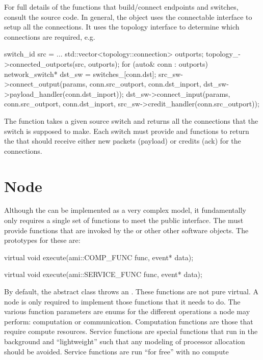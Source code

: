 For full details of the functions that build/connect endpoints and switches, consult the source code.
In general, the  object uses the connectable interface to setup all the connections.
It uses the topology interface to determine which connections are required, e.g.

\begin{CppCode}
switch_id src = ...
std::vector<topology::connection> outports;
topology_->connected_outports(src, outports);
for (auto& conn : outports){
  network_switch* dst_sw = switches_[conn.dst];
  src_sw->connect_output(params, conn.src_outport, conn.dst_inport,
  					 dst_sw->payload_handler(conn.dst_inport));
  dst_sw->connect_input(params, conn.src_outport, conn.dst_inport,
  				       src_sw->credit_handler(conn.src_outport));
}
\end{CppCode}
The  function takes a given source switch and returns all the connections that the
switch is supposed to make.  Each switch must provide  and  functions to return
the  that should receive either new packets (payload) or credits (ack) for the connections.

\section{Node}\label{sec:node}
Although the \nodecls can be implemented as a very complex model, it fundamentally only requires a single set of functions to meet the public interface.
The \nodecls must provide  functions that are invoked by the  or other other software objects.
The prototypes for these are:

\begin{CppCode}
virtual void
execute(ami::COMP_FUNC func, event* data);

virtual void
execute(ami::SERVICE_FUNC func, event* data);
\end{CppCode}	

By default, the abstract \nodecls class throws an . These functions are not pure virtual.
A node is only required to implement those functions that it needs to do.
The various function parameters are enums for the different operations a node may perform:
computation or communication. Computation functions are those that require compute resources. Service functions are special functions that run in the background and ``lightweight'' such that any modeling of processor allocation should be avoided. Service functions are run ``for free'' with no compute 


